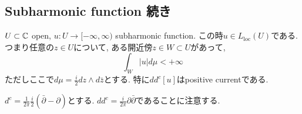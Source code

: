 \subsection{Subharmonic function 続き}
\begin{tcolorbox}[mybox]
\begin{thm}
$U \subset \mathbb{C}$ open, $u : U \to [-\infty, \infty)$ subharmonic function.
この時$u \in L_{\mathrm{loc}}(U)$である. 
つまり任意の$z \in U$について, ある開近傍$z \in W \subset U$があって, 
$$
\int_{W} |u| d \mu < +\infty
$$
ただしここで$d\mu=\frac{i}{2}dz \wedge d \bar{z}$とする. 
特に$dd^c[u]$はpositive currentである. 
\end{thm}
\end{tcolorbox}
$d^c=\frac{1}{2 \pi} \frac{i}{2}(\bar{\partial} - \partial)$とする. 
$dd^c = \frac{i}{2 \pi} \partial \bar{\partial}$であることに注意する. 
